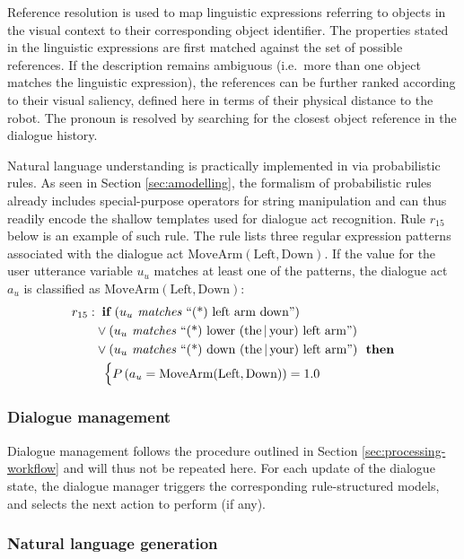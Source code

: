 Reference resolution is used to map linguistic expressions referring to objects in the visual context to their corresponding object identifier. The properties stated in the linguistic expressions are first matched against the set of possible references.  If the description remains ambiguous (i.e.\ more than one object matches the linguistic expression), the references can be further ranked according to their visual saliency, defined here in terms of their physical distance to the robot.  The pronoun  is resolved by searching for the closest object reference in the dialogue history. 

Natural language understanding is practically implemented in \opendial{} via probabilistic rules.  As seen in Section \ref{sec:amodelling}, the formalism of probabilistic rules already includes special-purpose operators for string manipulation and can thus readily encode the shallow templates used for dialogue act recognition.  Rule $r_{15}$ below is an example of such rule.  The rule lists three regular expression patterns associated with the dialogue act $\mathrm{MoveArm(Left,Down)}$.  If the value for the user utterance variable $u_u$ matches at least one of the patterns, the dialogue act $a_u$ is classified as $\mathrm{MoveArm(Left,Down)}$:
\begin{align*}
r_{15}: &\;\;\textbf{if} \ (u_u \textit{ matches } \text{``(*) left arm down''} ) \\ 
& \lor (u_u \textit{ matches } \text{``(*) lower (the\,|\,your) left arm''} ) \\
& \lor (u_u \textit{ matches } \text{``(*) down (the\,|\,your) left arm''}   )  \ \ \textbf{then} \\ 
& \; \; \begin{cases} P\left(a_u = \mathrm{MoveArm(Left,Down)}\right) = 1.0 \end{cases}
\end{align*}

\subsubsection*{Dialogue management}

Dialogue management follows the procedure outlined in Section \ref{sec:processing-workflow} and will thus not be repeated here. For each update of the dialogue state, the dialogue manager triggers the corresponding rule-structured models, and selects the next action to perform (if any). 

\subsubsection*{Natural language generation}

